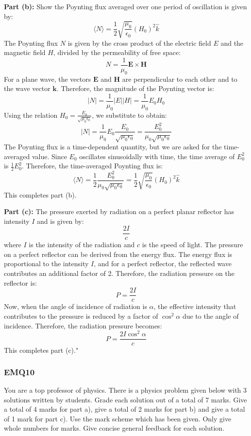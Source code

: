 \textbf{Part (b):} Show the Poynting flux averaged over one period of oscillation is given by:
\[
\langle N \rangle = \frac{1}{2} \sqrt{\frac{\mu_0}{\epsilon_0}} (H_0)^2 \hat{k}
\]
The Poynting flux \( N \) is given by the cross product of the electric field \( E \) and the magnetic field \( H \), divided by the permeability of free space:
\[
N = \frac{1}{\mu_0} \mathbf{E} \times \mathbf{H}
\]
For a plane wave, the vectors \( \mathbf{E} \) and \( \mathbf{H} \) are perpendicular to each other and to the wave vector \( \mathbf{k} \). Therefore, the magnitude of the Poynting vector is:
\[
|N| = \frac{1}{\mu_0} |E| |H| = \frac{1}{\mu_0} E_0 H_0
\]
Using the relation \( H_0 = \frac{E_0}{\sqrt{\mu_0 \epsilon_0}} \), we substitute to obtain:
\[
|N| = \frac{1}{\mu_0} E_0 \frac{E_0}{\sqrt{\mu_0 \epsilon_0}} = \frac{E_0^2}{\mu_0 \sqrt{\mu_0 \epsilon_0}}
\]
The Poynting flux is a time-dependent quantity, but we are asked for the time-averaged value. Since \( E_0 \) oscillates sinusoidally with time, the time average of \( E_0^2 \) is \( \frac{1}{2} E_0^2 \). Therefore, the time-averaged Poynting flux is:
\[
\langle N \rangle = \frac{1}{2} \frac{E_0^2}{\mu_0 \sqrt{\mu_0 \epsilon_0}} = \frac{1}{2} \sqrt{\frac{\mu_0}{\epsilon_0}} (H_0)^2 \hat{k}
\]
This completes part (b).

\textbf{Part (c):} The pressure exerted by radiation on a perfect planar reflector has intensity \( I \) and is given by:
\[
\frac{2I}{c}
\]
where \( I \) is the intensity of the radiation and \( c \) is the speed of light. The pressure on a perfect reflector can be derived from the energy flux. The energy flux is proportional to the intensity \( I \), and for a perfect reflector, the reflected wave contributes an additional factor of 2. Therefore, the radiation pressure on the reflector is:
\[
P = \frac{2I}{c}
\]
Now, when the angle of incidence of radiation is \( \alpha \), the effective intensity that contributes to the pressure is reduced by a factor of \( \cos^2 \alpha \) due to the angle of incidence. Therefore, the radiation pressure becomes:
\[
P = \frac{2I \cos^2 \alpha}{c}
\]
This completes part (c)."

\subsubsection{EMQ10}

You are a top professor of physics. There is a physics problem given below with 3 solutions written by students. Grade each solution out of a total of 7 marks. Give a total of 4 marks for part a), give a total of 2 marks for part b) and give a total of 1 mark for part c). Use the mark scheme which has been given. Only give whole numbers for marks. Give concise general feedback for each solution. 

